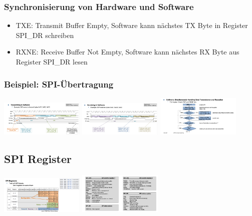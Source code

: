\subsubsection{Synchronisierung von Hardware und Software}

\begin{itemize}
    \item TXE: Transmit Buffer Empty, Software kann nächstes TX Byte in Register SPI\_DR schreiben
    \item RXNE: Receive Buffer Not Empty, Software kann nächstes RX Byte aus Register SPI\_DR lesen
\end{itemize}

\subsubsection{Beispiel: SPI-Übertragung}
\includegraphics[width=0.3\textwidth]{sections/images/spi_example.png}
\includegraphics[width=0.3\textwidth]{sections/images/spi_example2.png}
\includegraphics[width=0.3\textwidth]{sections/images/spi_sim.png}

\subsection{SPI Register}
\includegraphics[width=0.3\textwidth]{sections/images/spi_register.png}
\includegraphics[width=0.3\textwidth]{sections/images/spi_register_bits.png}